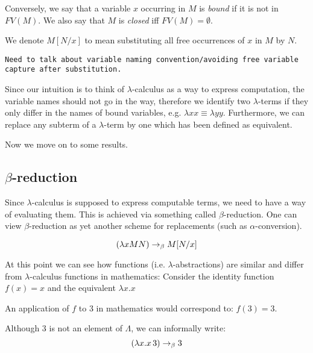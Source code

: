Conversely, we say that a variable $x$ occurring in $M$ is \emph{bound} if it is
not in $FV(M)$. We also say that $M$ is \emph{closed} iff $FV(M) = \emptyset$.

We denote $M[N/x]$ to mean substituting all free occurrences of $x$ in $M$ by $N$.

{\center \texttt{Need to talk about variable naming convention/avoiding free
    variable capture after substitution.}}

\begin{definition}
Since our intuition is to think of $\lambda$-calculus as a way to express
computation, the variable names should not go in the way, therefore we identify
two $\lambda$-terms if they only differ in the names of bound variables, e.g.
$\lambda x x \equiv \lambda y y$. Furthermore, we can replace any subterm of a
$\lambda$-term by one which has been defined as equivalent.
\end{definition}

Now we move on to some results.

\subsection{$\beta$-reduction}

Since $\lambda$-calculus is supposed to express computable terms, we need to
have a way of evaluating them. This is achieved via something called
$\beta$-reduction. One can view $\beta$-reduction as yet another scheme for
replacements (such as $\alpha$-conversion).

\begin{definition}
\[ (\lambda x M N) \rightarrow_\beta M[N/x] \]
\end{definition}

At this point we can see how functions (i.e. $\lambda$-abstractions) are
similar and differ from $\lambda$-calculus functions in mathematics:
Consider the identity function $f(x) = x$ and the equivalent $\lambda x. x$

An application of $f$ to $3$ in mathematics would correspond to: $f(3) = 3$.

Although $3$ is not an element of $\Lambda$, we can informally write:
    \[ (\lambda x. x\, 3) \rightarrow_\beta 3 \]

